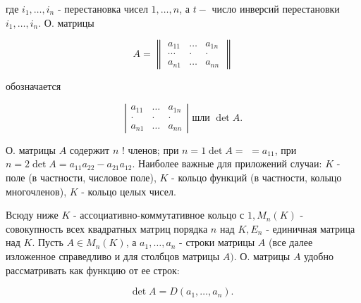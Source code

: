 \documentclass[10pt]{article}
\begin{document}
где $i_{1}, \ldots, i_{n}$ - перестановка чисел $1, \ldots, n$, а $t-$ число инверсий перестановки $i_{1}, \ldots, i_{n}$. О. матрицы



\[

A=\left\|\begin{array}{ccc}

a_{11} & \ldots & a_{1 n} \\

\cdots & \cdot & \cdot \\

a_{n 1} & \ldots & a_{n n}

\end{array}\right\|

\]



обозначается



\[

\left|\begin{array}{ccc}

a_{11} & \ldots & a_{1 n} \\

\cdot & \cdot & \cdot \\

a_{n 1} & \ldots & a_{n n}

\end{array}\right| \text { шли } \operatorname{det} A .

\]



О. матрицы $A$ содержит $n$ ! членов; при $n=1 \operatorname{det} A=$ $=a_{11}$, при $n=2 \operatorname{det} A=a_{11} a_{22}-a_{21} a_{12}$. Наиболее важные для приложений случаи: $K$ - поле (в частности, числовое поле), $K$ - кольцо функций (в частности, колыцо многочленов), $K$ - кольцо целых чисел.



Всюду ниже $K$ - ассоциативно-коммутативное кольцо с $1, M_{n}(K)$ - совокупность всех квадратных матриц порядка $n$ над $K, E_{n}$ - единичная матрица над $K$. Пусть $A \in M_{n}(K)$, а $a_{1}, \ldots, a_{n}$ - строки матрицы $A$ (все далее изложенное справедливо и для столбцов матрицы $A)$. О. матрицы $A$ удобно рассматривать как функцию от ее строк:



\[

\operatorname{det} A=D\left(a_{1}, \ldots, a_{n}\right) \text {. }

\]
\end{document}
